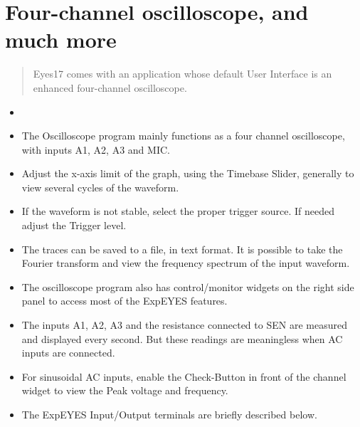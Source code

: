 \documentclass[a4paper,12pt,english]{sphinxmanual}
\let\sphinxpxdimen\pdfpxdimen\else\newdimen\sphinxpxdimen
\begin{document}
\section{Four-channel oscilloscope, and much more}
\label{\detokenize{3.1:four-channel-oscilloscope-and-much-more}}\label{\detokenize{3.1::doc}}\begin{quote}

Eyes17 comes with an application whose default User Interface is an
enhanced four-channel oscilloscope.
\end{quote}
\begin{itemize}
\item {} 

\item {} 
The Oscilloscope program mainly functions as a four channel
oscilloscope, with inputs A1, A2, A3 and MIC.

\item {} 
Adjust the x-axis limit of the graph, using the Timebase Slider,
generally to view several cycles of the waveform.

\item {} 
If the waveform is not stable, select the proper trigger source. If
needed adjust the Trigger level.

\item {} 
The traces can be saved to a file, in text format. It is possible to
take the Fourier transform and view the frequency spectrum of the
input waveform.

\item {} 
The oscilloscope program also has control/monitor widgets on the
right side panel to access most of the ExpEYES features.

\item {} 
The inputs A1, A2, A3 and the resistance connected to SEN are
measured and displayed every second. But these readings are
meaningless when AC inputs are connected.

\item {} 
For sinusoidal AC inputs, enable the Check-Button in front of the
channel widget to view the Peak voltage and frequency.

\item {} 
The ExpEYES Input/Output terminals are briefly described below.

\end{itemize}

\begin{figure}[htbp]
\centering

\noindent\sphinxincludegraphics[width=300\sphinxpxdimen]{{scope-outputs}.pdf}
\end{figure}
\end{document}
